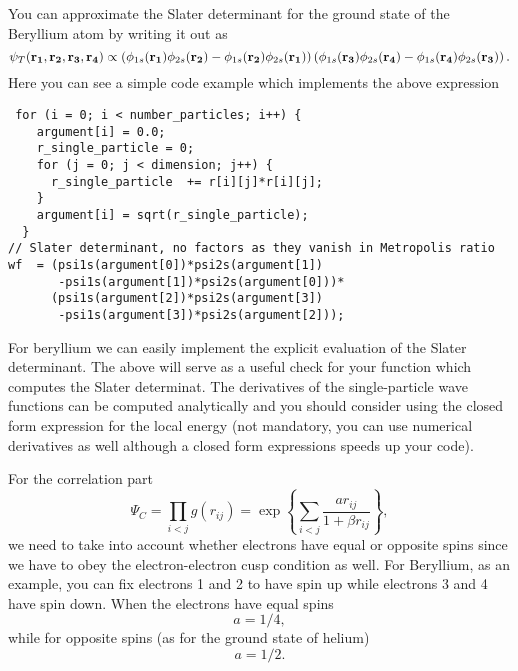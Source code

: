 \documentclass[10pt]{article}
\begin{document}
You can approximate the Slater determinant for the ground state of the Beryllium atom
by writing it out as
\begin{equation}
   \psi_{T}({\bf r_1},{\bf r_2}, {\bf r_3}, {\bf r_4}) \propto 
\left(\phi_{1s}({\bf r_1})\phi_{2s}({\bf r_2})-\phi_{1s}({\bf r_2})\phi_{2s}({\bf r_1})\right)
\left(\phi_{1s}({\bf r_3})\phi_{2s}({\bf r_4})-\phi_{1s}({\bf r_4})\phi_{2s}({\bf r_3})\right).
\end{equation}
Here you can see a simple code example which implements the above expression
\begin{lstlisting}
 for (i = 0; i < number_particles; i++) {
    argument[i] = 0.0;
    r_single_particle = 0;
    for (j = 0; j < dimension; j++) {
      r_single_particle  += r[i][j]*r[i][j];
    }
    argument[i] = sqrt(r_single_particle);
  }
// Slater determinant, no factors as they vanish in Metropolis ratio
wf  = (psi1s(argument[0])*psi2s(argument[1])
       -psi1s(argument[1])*psi2s(argument[0]))*
      (psi1s(argument[2])*psi2s(argument[3])
       -psi1s(argument[3])*psi2s(argument[2]));
\end{lstlisting}
For beryllium we can easily implement the explicit evaluation of the Slater determinant.  The above will serve as a useful check
for your function which computes the Slater determinat. 
The derivatives of the single-particle wave functions can be computed analytically and you should consider
using the closed form expression for the local energy (not mandatory, you can use numerical derivatives as well although a closed form expressions speeds up your code).

For the correlation part 
\[
\Psi_C=\prod_{i< j}g(r_{ij})= \exp{\left\{\sum_{i<j}\frac{ar_{ij}}{1+\beta r_{ij}}\right\}},
\]
we need to take into account whether electrons have equal or opposite spins since we have to obey the
electron-electron cusp condition as well.  For Beryllium, as an example,  you can fix electrons 1 and 2 to have spin up while
electrons 3 and 4 have spin down.
When the electrons have  equal spins 
\[
a= 1/4,
\]
while for opposite spins (as for the ground state of  helium)
\[
a= 1/2.
\] 
\end{document}
